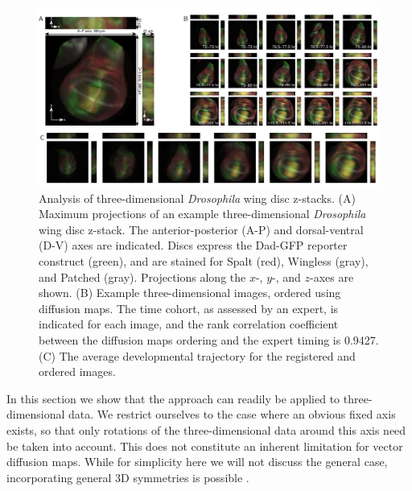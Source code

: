 \begin{figure}[t]
\includegraphics[width=\textwidth]{fig6}
\caption[Analysis of three-dimensional {\em Drosophila} wing disc z-stacks]{Analysis of three-dimensional {\em Drosophila} wing disc z-stacks. (A) Maximum projections of an example three-dimensional {\em Drosophila} wing disc z-stack. The anterior-posterior (A-P) and dorsal-ventral (D-V) axes are indicated. Discs express the Dad-GFP reporter construct (green), and are stained for Spalt (red), Wingless (gray), and Patched (gray). Projections along the $x$-, $y$-, and $z$-axes are shown. (B) Example three-dimensional images, ordered using diffusion maps. The time cohort, as assessed by an expert, is indicated for each image, and the rank correlation coefficient between the diffusion maps ordering and the expert timing is 0.9427. (C) The average developmental trajectory for the registered and ordered images. }
\label{fig:wing_disc}
\end{figure}

In this section we show that the approach can readily be applied to three-dimensional data.
%
We restrict ourselves to the case where an obvious fixed axis exists, so that only rotations of the three-dimensional data around this axis need be taken into account.
%
This does not constitute an inherent limitation for vector diffusion maps.
%
While for simplicity here we will not discuss the general  case, incorporating general 3D symmetries is possible \citep{arie2012global, wang2013exact, cucuringu2012eigenvector}.

